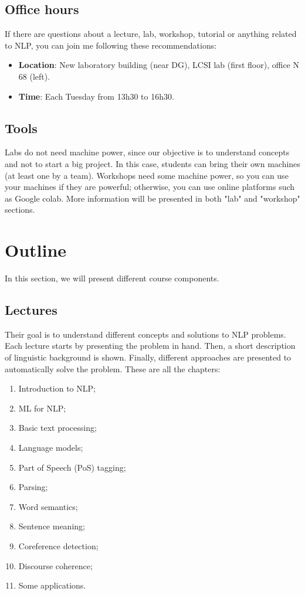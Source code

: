 \documentclass[11pt, a4paper]{article}
\begin{document}
\subsection{Office hours}

If there are questions about a lecture, lab, workshop, tutorial or anything related to NLP, you can join me following these recommendations:
\begin{itemize}
	\item \textbf{Location}: New laboratory building (near DG), LCSI lab (first floor), office N 68 (left).
	\item \textbf{Time}: Each Tuesday from 13h30 to 16h30.
\end{itemize}

\subsection{Tools}

Labs do not need machine power, since our objective is to understand concepts and not to start a big project. 
In this case, students can bring their own machines (at least one by a team). 
Workshops need some machine power, so you can use your machines if they are powerful; otherwise, you can use online platforms such as Google colab.
More information will be presented in both "lab" and "workshop" sections.

\section{Outline}

In this section, we will present different course components.

\subsection{Lectures}

Their goal is to understand different concepts and solutions to NLP problems. 
Each lecture starts by presenting the problem in hand. 
Then, a short description of linguistic background is shown.
Finally, different approaches are presented to automatically solve the problem.
These are all the chapters:
\begin{enumerate}
	\item Introduction to NLP;
	\item ML for NLP;
	\item Basic text processing;
	\item Language models;
	\item Part of Speech (PoS) tagging;
	\item Parsing;
	\item Word semantics;
	\item Sentence meaning;
	\item Coreference detection;
	\item Discourse coherence;
	\item Some applications.
\end{enumerate}
\end{document}

